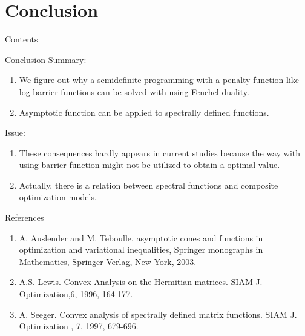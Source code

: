 \documentclass[aspectratio=169, dvipdfmx, 11pt]{beamer} %
\begin{document}
\section{Conclusion}
\begin{frame}{Contents}
  \tableofcontents[currentsection]
\end{frame}

\begin{frame}{Conclusion}
  Summary:
  \begin{enumerate}[]
    \item We figure out why a semidefinite programming with a penalty function like log barrier functions can be solved with using Fenchel duality.
    \item Asymptotic function can be applied to spectrally defined functions.
  \end{enumerate}
  Issue:
  \begin{enumerate}[]
    \item These consequences hardly appears in current studies because the way with using barrier function might not be utilized to obtain a optimal value.
    \item Actually, there is a relation between spectral functions and composite optimization models.
  \end{enumerate}
\end{frame}

\begin{frame}[t]{References}
  \begin{enumerate}[]
    \item A. Auslender and M. Teboulle, asymptotic cones and functions in optimization and variational inequalities, Springer monographs in Mathematics, Springer-Verlag, New York, 2003.
    \item A.S. Lewis. Convex Analysis on the Hermitian matrices. SIAM J. Optimization,6, 1996, 164-177.
    \item A. Seeger. Convex analysis of spectrally defined matrix functions. SIAM J. Optimization , 7, 1997, 679-696.
  \end{enumerate}
\end{frame}
\end{document}
